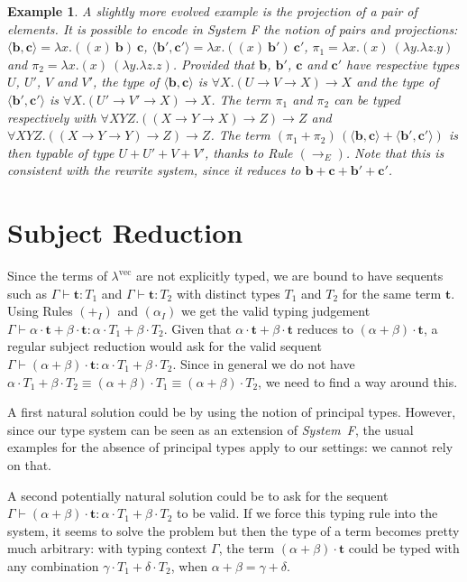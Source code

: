 \documentclass[colorlinks=true,linkcolor=black,urlcolor=black,citecolor=blue,submission,copyright,creativecommons]{eptcs}
\newtheorem{example}{Example}[section]
\newcommand{\lvec}{\ensuremath{\lambda^{\!\!\textrm{vec}}}}
\newcommand{\ve}[1]{\mathrm{\textbf{#1}}}
\newcommand{\type}{\colon\!}
\begin{document}
\begin{example}\label{ex:3}\rm
  A slightly more evolved example is the projection of a pair of
  elements. It is possible to encode in {\em System F} the notion of pairs
  and projections: $\langle \ve b, \ve c\rangle = \lambda x.((x)~\ve
  b)~\ve c$, $\langle \ve b', \ve c'\rangle = \lambda x.((x)~\ve
  b')~\ve c'$, $\pi_1 = \lambda x.(x)~(\lambda y.\lambda z.y)$ and
  $\pi_2 = \lambda x.(x)~(\lambda y.\lambda z.z)$. Provided that $\ve
  b$, $\ve b'$, $\ve c$ and $\ve c'$ have respective types $U$, $U'$,
  $V$ and $V'$, the type of $\langle \ve b, \ve c\rangle$ is $\forall
  X.(U\to V\to X)\to X$ and the type of $\langle \ve b',
  \ve c'\rangle$ is $\forall X.(U'\to V'\to X)\to X$. The term $\pi_1$
  and $\pi_2$ can be typed respectively with $\forall XYZ.((X\to Y\to
  X)\to Z)\to Z$ and $\forall XYZ.((X\to Y\to Y)\to Z)\to Z$.
    The term $(\pi_1 + \pi_2)\,(\langle \ve b, \ve c\rangle + \langle
  \ve b', \ve c'\rangle)$ is then typable of type $U+U'+V+V'$, thanks
  to Rule $(\to_E)$. Note that this is consistent with the rewrite
  system, since it reduces to $\ve b + \ve c +
  \ve b' + \ve c'$.
\end{example}


\section{Subject Reduction}\label{sec:sr}

Since the terms of $\lvec$ are not explicitly typed, we are bound to
have sequents such as $\Gamma\vdash\ve{t}\type T_1$ and
$\Gamma\vdash\ve{t}\type T_2$ with distinct types $T_1$ and $T_2$
for the same term $\ve t$.
Using Rules
$(+_I)$ and $(\alpha_I)$ we get the valid typing judgement
$\Gamma\vdash\alpha\cdot \ve t+\beta\cdot \ve t\type\alpha\cdot
T_1+\beta\cdot T_2$. Given that $\alpha\cdot \ve t+\beta\cdot \ve t$
reduces to $(\alpha+\beta)\cdot \ve t$, a regular subject reduction
would ask for the valid sequent $\Gamma\vdash(\alpha+\beta)\cdot \ve
t\type\alpha\cdot T_1+\beta\cdot T_2$.  Since in general we do not
have $\alpha\cdot T_1+\beta\cdot T_2\equiv(\alpha+\beta)\cdot
T_1\equiv(\alpha+\beta)\cdot T_2$, we need to find a way around
this.

A first natural solution could be by using the notion of principal
types. However, since our type system can be seen as an extension of {\em System~F},
the usual examples for the absence of principal types apply to our
settings: we cannot rely on that.

A second potentially natural solution could be to ask for the sequent
$\Gamma\vdash(\alpha+\beta)\cdot \ve t\type\alpha\cdot T_1+\beta\cdot
T_2$ to be valid. If we force this typing rule into the system, it
seems to solve the problem but then the type of a term becomes pretty
much arbitrary: with typing context $\Gamma$, the term
$(\alpha+\beta)\cdot\ve t$ could be typed with any combination
$\gamma\cdot T_1 + \delta\cdot T_2$, when $\alpha+\beta=\gamma+\delta$.
\end{document}

